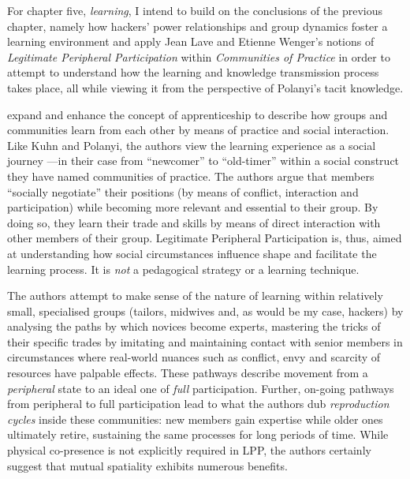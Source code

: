 For chapter five, \textit{learning}, I intend to build on the conclusions of the previous chapter, namely how hackers' power relationships and group dynamics foster a learning environment and apply Jean Lave and Etienne Wenger's \citeyearpar{lave91} notions of \textit{Legitimate Peripheral Participation} within \textit{Communities of Practice} in order to attempt to understand how the learning and knowledge transmission process takes place, all while viewing it from the perspective of Polanyi's tacit knowledge.

\citeauthor{lave91} expand and enhance the concept of apprenticeship to describe how groups and communities learn from each other by means of practice and social interaction. Like Kuhn and Polanyi, the authors view the learning experience as a social journey ---in their case from ``newcomer'' to ``old-timer'' \citep[p.56--57]{lave91} within a social construct they have named communities of practice. The authors argue that members ``socially negotiate'' their positions (by means of conflict, interaction and participation) while becoming more relevant and essential to their group. By doing so, they learn their trade and skills by means of direct interaction with other members of their group. Legitimate Peripheral Participation is, thus, aimed at understanding how social circumstances influence shape and facilitate the learning process. It is \emph{not} a pedagogical strategy or a learning technique.

The authors attempt to make sense of the nature of learning within relatively small, specialised groups (tailors, midwives and, as would be my case, hackers) by analysing the paths by which novices become experts, mastering the tricks of their specific trades by imitating and maintaining contact with senior members in circumstances where real-world nuances such as conflict, envy and scarcity of resources have palpable effects. These pathways describe movement from a \textit{peripheral} state to an ideal one of \textit{full} participation. Further, on-going pathways from peripheral to full participation lead to what the authors dub \textit{reproduction cycles} inside these communities: new members gain expertise while older ones ultimately retire, sustaining the same processes for long periods of time. While physical co-presence is not explicitly required in LPP, the authors certainly suggest that mutual spatiality exhibits numerous benefits.

